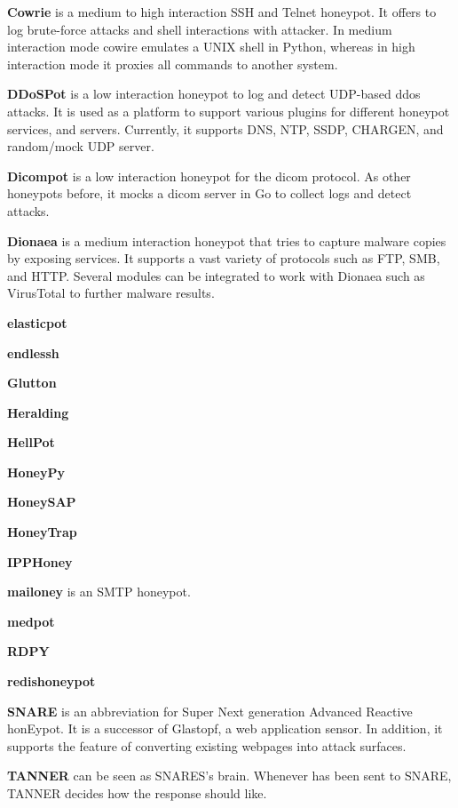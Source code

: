 \textbf{Cowrie} \cite{cowire2021} is a medium to high interaction SSH and Telnet honeypot.
It offers to log brute-force attacks and shell interactions with attacker.
In medium interaction mode cowire emulates a UNIX shell in Python, whereas in high interaction mode it proxies all commands to another system.

\textbf{DDoSPot} \cite{ddosspot2021} is a low interaction honeypot to log and detect UDP-based \ac{ddos} attacks.
It is used as a platform to support various plugins for different honeypot services, and servers.
Currently, it supports DNS, NTP, SSDP, CHARGEN, and random/mock UDP server.

\textbf{Dicompot} \cite{dicompot2021} is a low interaction honeypot for the \ac{dicom} protocol.
As other honeypots before, it mocks a \ac{dicom} server in Go to collect logs and detect attacks.

\textbf{Dionaea} \cite{dionaea2021} is a medium interaction honeypot that tries to capture malware copies by exposing services.
It supports a vast variety of protocols such as FTP, SMB, and HTTP.
Several modules can be integrated to work with Dionaea such as VirusTotal to further malware results.

\textbf{elasticpot} \cite{elasticpot2021}

\textbf{endlessh} \cite{endlessh2021}

\textbf{Glutton} \cite{glutton2021}

\textbf{Heralding} \cite{heralding2021}

\textbf{HellPot} \cite{hellpot2021}

\textbf{HoneyPy} \cite{honeysap2021}

\textbf{HoneySAP} \cite{honeysap2021}

\textbf{HoneyTrap} \cite{honeytrap2021}

\textbf{IPPHoney} \cite{ipphoney2021}

\textbf{mailoney} is an SMTP honeypot.

\textbf{medpot} \cite{medpot2021}

\textbf{RDPY} \cite{rdpy2021}

\textbf{redishoneypot}

\textbf{SNARE} \cite{snare2021} is an abbreviation for Super Next generation Advanced Reactive honEypot.
It is a successor of Glastopf, a web application sensor.
In addition, it supports the feature of converting existing webpages into attack surfaces.

\textbf{TANNER} \cite{tanner2021} can be seen as SNARES's brain.
Whenever has been sent to SNARE, TANNER decides how the response should like.


